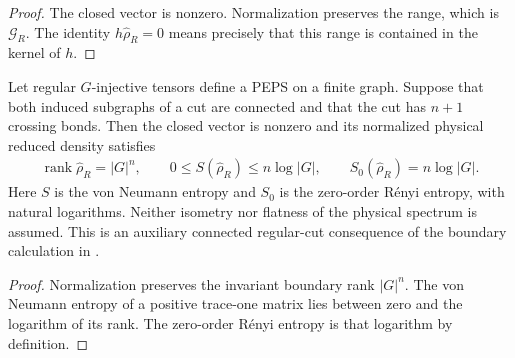 \begin{proof}\leanok
    The closed vector is nonzero. Normalization preserves the range,
    which is $\mathcal G_R$. The identity $h\widehat\rho_R=0$ means
    precisely that this range is contained in the kernel of $h$.
\end{proof}

\begin{theorem}%
    \label{thm:peps_regular_region_entropy_bound}
    \leanok
    Let regular $G$-injective tensors define a PEPS on a finite graph.
    Suppose that both induced subgraphs of a cut are connected and
    that the cut has $n+1$ crossing bonds. Then the closed vector is
    nonzero and its normalized physical reduced density satisfies
    \begin{align}
        \operatorname{rank}\widehat\rho_R=|G|^n,
        \qquad
        0\leq S(\widehat\rho_R)\leq n\log|G|,
        \qquad
        S_0(\widehat\rho_R)=n\log|G|.
    \end{align}
    Here $S$ is the von Neumann entropy and $S_0$ is the zero-order
    R\'enyi entropy, with natural logarithms. Neither isometry nor
    flatness of the physical spectrum is assumed. This is an
    auxiliary connected regular-cut consequence of the boundary
    calculation in \cite[Corollary~6.10]{Schuch2010PEPS}.
\end{theorem}

\begin{proof}\leanok
    Normalization preserves the invariant boundary rank $|G|^n$.
    The von Neumann entropy of a positive trace-one matrix lies
    between zero and the logarithm of its rank. The zero-order
    R\'enyi entropy is that logarithm by definition.
\end{proof}
